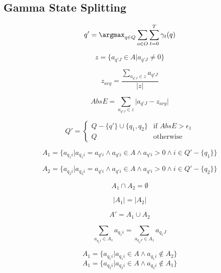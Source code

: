 \subsection{Gamma State Splitting}

$$q' = \argmax_{q \in Q}\sum_{o \in O}\sum_{t=0}^{T}\gamma_t(q)$$ 

$$z = \{a_{q'J} \in A \vert a_{q'J} \neq 0\}$$

$$z_{arg} = \frac{\sum_{a_{q'J} \in z} a_{q'J}}{\vert z \vert}$$

$$AbsE = \sum_{a_{q'J} \in z} \vert a_{q'J} - z_{arg} \vert$$

$$Q' = \begin{cases}
	Q-\{q'\} \cup \{ q_1,q_2 \} &\text{if } AbsE > \epsilon_1 \\
	Q	&\text{otherwise}
\end{cases}$$

% 
$$A_1 = \{a_{q_1i} \vert a_{q_1i} = a_{q'i} \wedge a_{q'i} \in A \wedge a_{q'i} >0 \wedge i \in Q' - \{q_1\}\}$$

$$A_2 = \{a_{q_2i} \vert a_{q_2i} = a_{q'i} \wedge a_{q'i} \in A \wedge a_{q'i} > 0 \wedge i \in Q' - \{q_2\}\}$$

$$A_1 \cap A_2 = \emptyset$$

$$\vert A_1 \vert = \vert A_2 \vert$$

$$A' = A_1 \cup A_2$$

$$\sum_{a_{q_1i} \in A_1} a_{q_1i} = \sum_{a_{q_2J} \in A_1} a_{q_1J}$$

$$A_1 = \{a_{q_1i} \vert a_{q_1i} \in A \wedge a_{q_1i} \notin A_2\}$$
	$$A_1 = \{a_{q_2i} \vert a_{q_2i} \in A \wedge a_{q_2i} \notin A_1\}$$



